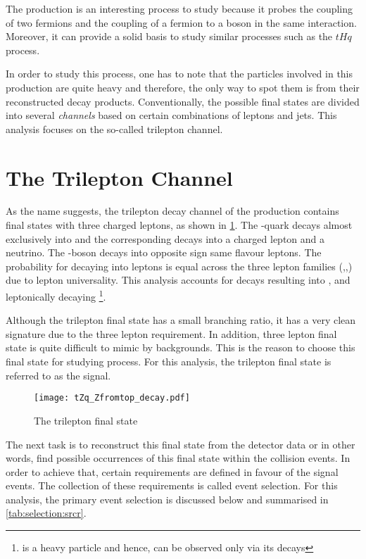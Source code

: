 The \tZq production is an interesting process to study because it probes the coupling
of two fermions and the coupling of a fermion to a boson in the same interaction. Moreover, 
it can provide a solid basis to study similar processes such as the $tHq$ process. 

In order to study this process, one has to note 
that the particles involved in this production are quite heavy and therefore,
the only way to spot them is from their reconstructed decay products. 
Conventionally, the possible final states are divided into several \textit{channels}
based on certain combinations of leptons and jets. This analysis focuses on
the so-called trilepton channel.

\section{The \tZqsec Trilepton Channel}
As the name suggests, the trilepton decay channel of the \tZq production 
contains final states with three charged leptons, as shown in \cref{fig:tZqtrilep}. The
\Ptop-quark decays almost exclusively into \Pbottom\PW and the corresponding \PW decays into a charged lepton and
a neutrino. The \PZ-boson decays into opposite sign same flavour leptons. The probability for
\PZ decaying into leptons is equal across the three lepton families (\Pelectron,\Pmu,\Ptau) due to 
lepton universality. This analysis accounts for \PZ decays resulting into \Pelectron, \Pmu and 
leptonically decaying \Ptau \footnote{\Ptau is a heavy particle and hence, can be observed only via its decays}.   

Although the trilepton final state has a small branching ratio, it has a very clean signature
due to the three lepton requirement. In addition, three lepton final state is quite difficult
to mimic by backgrounds. This is the reason to choose this final state for studying \tZq process.
For this analysis, the trilepton final state is referred to as the signal.

\begin{figure}
  \centering
      \texttt{[image: tZq\_Zfromtop\_decay.pdf]}
      \caption{The \tZq trilepton final state}
         \label{fig:tZqtrilep}
\end{figure}

The next task is to reconstruct this final state from the detector data or in other words, find
possible occurrences of this final state within the collision events. In order to achieve that,
certain requirements are defined in favour of the signal events. The collection of these requirements
is called event selection. For this analysis, the primary event selection is discussed below and
summarised in \cref{tab:selection:srcr}.

